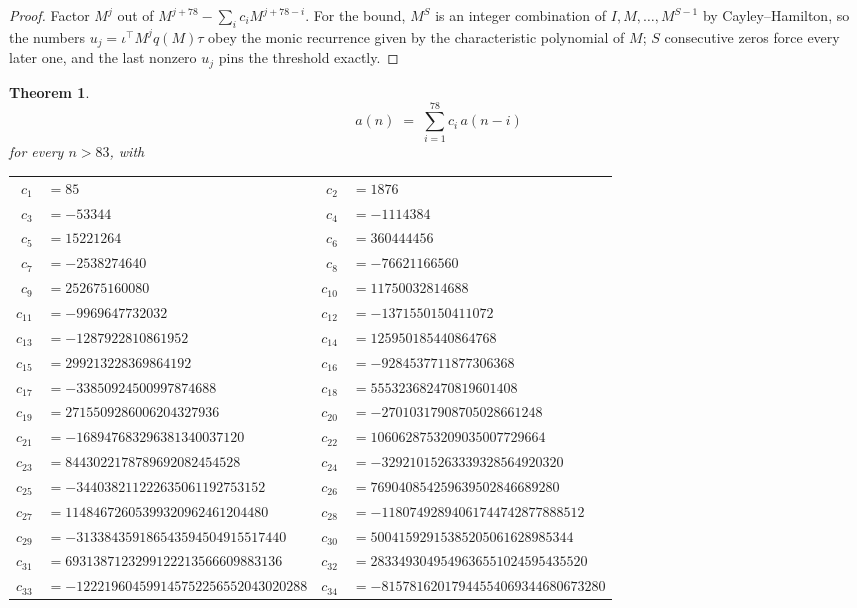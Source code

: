 \documentclass[11pt,a4paper]{article}
\theoremstyle{plain}
\newtheorem{theorem}{Theorem}
\theoremstyle{definition}
\begin{document}
\begin{proof}
Factor $M^{j}$ out of $M^{j+78}-\sum_ic_iM^{j+78-i}$. For the bound, $M^{S}$
is an integer combination of $I,M,\dots,M^{S-1}$ by Cayley--Hamilton, so the numbers
$u_j=\iota^{\!\top}M^{j}q(M)\tau$ obey the monic recurrence given by the characteristic
polynomial of $M$; $S$ consecutive zeros force every later one, and the last nonzero $u_j$
pins the threshold exactly.
\end{proof}

\begin{theorem}
\[
a(n)\;=\;\sum_{i=1}^{78}c_i\,a(n-i)
\]
for every $n>83$, with
\begin{center}\footnotesize
\begin{tabular}{r@{\,}l@{\qquad}r@{\,}l}
$c_{1}$ & $=85$ & $c_{2}$ & $=1876$ \\
$c_{3}$ & $=-53344$ & $c_{4}$ & $=-1114384$ \\
$c_{5}$ & $=15221264$ & $c_{6}$ & $=360444456$ \\
$c_{7}$ & $=-2538274640$ & $c_{8}$ & $=-76621166560$ \\
$c_{9}$ & $=252675160080$ & $c_{10}$ & $=11750032814688$ \\
$c_{11}$ & $=-9969647732032$ & $c_{12}$ & $=-1371550150411072$ \\
$c_{13}$ & $=-1287922810861952$ & $c_{14}$ & $=125950185440864768$ \\
$c_{15}$ & $=299213228369864192$ & $c_{16}$ & $=-9284537711877306368$ \\
$c_{17}$ & $=-33850924500997874688$ & $c_{18}$ & $=555323682470819601408$ \\
$c_{19}$ & $=2715509286006204327936$ & $c_{20}$ & $=-27010317908705028661248$ \\
$c_{21}$ & $=-168947683296381340037120$ & $c_{22}$ & $=1060628753209035007729664$ \\
$c_{23}$ & $=8443022178789692082454528$ & $c_{24}$ & $=-32921015263339328564920320$ \\
$c_{25}$ & $=-344038211222635061192753152$ & $c_{26}$ & $=769040854259639502846689280$ \\
$c_{27}$ & $=11484672605399320962461204480$ & $c_{28}$ & $=-11807492894061744742877888512$ \\
$c_{29}$ & $=-313384359186543594504915517440$ & $c_{30}$ & $=50041592915385205061628985344$ \\
$c_{31}$ & $=6931387123299122213566609883136$ & $c_{32}$ & $=2833493049549636551024595435520$ \\
$c_{33}$ & $=-122219604599145752256552043020288$ & $c_{34}$ & $=-81578162017944554069344680673280$ \\

\end{tabular}
\end{center}
\end{theorem}
\end{document}
